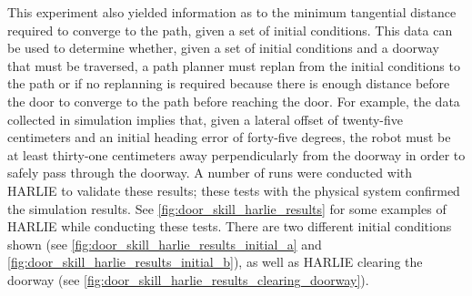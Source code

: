 This experiment also yielded information as to the minimum tangential distance required to converge to the path, given a set of initial conditions. This data can be used to determine whether, given a set of initial conditions and a doorway that must be traversed, a path planner must replan from the initial conditions to the path or if no replanning is required because there is enough distance before the door to converge to the path before reaching the door. For example, the data collected in simulation implies that, given a lateral offset of twenty-five centimeters and an initial heading error of forty-five degrees, the robot must be at least thirty-one centimeters away perpendicularly from the doorway in order to safely pass through the doorway. A number of runs were conducted with HARLIE to validate these results; these tests with the physical system confirmed the simulation results. See \autoref{fig:door_skill_harlie_results} for some examples of HARLIE while conducting these tests.  There are two different initial conditions shown (see \autoref{fig:door_skill_harlie_results_initial_a} and \autoref{fig:door_skill_harlie_results_initial_b}), as well as HARLIE clearing the doorway (see \autoref{fig:door_skill_harlie_results_clearing_doorway}).

